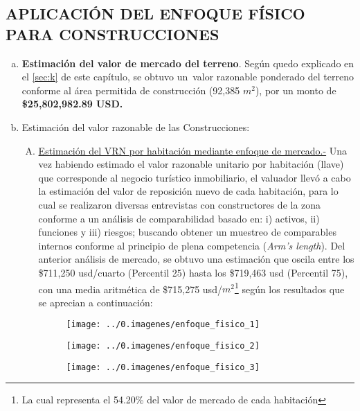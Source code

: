 \subsection{APLICACIÓN DEL ENFOQUE FÍSICO PARA CONSTRUCCIONES}

\begin{enumerate}[a)]
\item \textcolor{principal}{\textbf{Estimación del valor de mercado del terreno}}.  Según quedo explicado en el \autoref{sec:k} de este capítulo, se obtuvo un\ valor razonable ponderado del terreno conforme al área permitida de construcción (92,385 $m^2$), por un monto de \textcolor{principal}{\textbf{\$25,802,982.89  USD.}}
\item Estimación del valor razonable de las Construcciones:

\begin{enumerate}[B.1.]
\item \underline{Estimación del VRN por habitación mediante enfoque de mercado.-} Una vez habiendo estimado el valor razonable unitario por habitación (llave) que corresponde al negocio turístico inmobiliario, el valuador llevó a cabo la estimación del valor de reposición nuevo de cada habitación, para lo cual se realizaron diversas entrevistas con constructores de la zona conforme a un análisis de comparabilidad basado en: i) activos, ii) funciones y iii) riesgos; buscando obtener un muestreo de comparables internos conforme al principio de plena competencia (\textit{Arm’s length}). Del anterior análisis de mercado, se obtuvo una estimación que oscila entre los \$711,250 usd/cuarto (Percentil 25) hasta los \$719,463 usd (Percentil 75), con una media aritmética de \$715,275 usd/$m^2$\footnote{La cual representa el 54.20\% del valor de mercado de cada habitación}  según los resultados que se aprecian a continuación:

\begin{figure}[H]
\centering
\texttt{[image: ../0.imagenes/enfoque\_fisico\_1]}

\end{figure}

\begin{figure}[H]
\centering
\texttt{[image: ../0.imagenes/enfoque\_fisico\_2]}

\end{figure}

\begin{figure}[H]
\centering
\texttt{[image: ../0.imagenes/enfoque\_fisico\_3]}


\end{figure}
\end{enumerate}
\end{enumerate}
